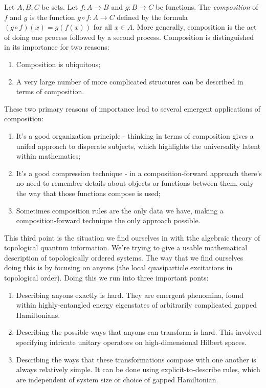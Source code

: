 \documentclass{article}
\theoremstyle{definition}
\numberwithin{figure}{section}
\begin{document}
Let $A,B,C$ be sets. Let $f:A\to B$ and $g:B\to C$ be functions. The \textit{composition} of $f$ and $g$ is the function $g\circ f: A\to C$ defined by the formula $(g\circ f)(x)=g(f(x))$ for all $x\in A$. More generally, composition is the act of doing one process followed by a second process. Composition is distinguished in its importance for two reasons:

\begin{enumerate}
\item Composition is ubiquitous;
\item A very large number of more complicated structures can be described in terms of composition.
\end{enumerate}

These two primary reasons of importance lead to several emergent applications of composition:

\begin{enumerate}
\item It's a good organization principle - thinking in terms of composition gives a unifed approach to disperate subjects, which highlights the universality latent within mathematics;
\item It's a good compression technique - in a composition-forward approach there's no need to remember details about objects or functions between them, only the way that those functions compose is used;
\item Sometimes composition rules are the only data we have, making a composition-forward technique the only approach possible.
\end{enumerate}

This third point is the situation we find ourselves in with tthe algebraic theory of topological quantum information. We're trying to give a usable mathematical description of topologically ordered systems. The way that we find ourselves doing this is by focusing on anyons (the local quasiparticle excitations in topological order). Doing this we run into three important ponts:

\begin{enumerate}
\item Describing anyons exactly is hard. They are emergent phenomina, found within highly-entangled energy eigenstates of arbitrarily complicated gapped Hamiltonians.
\item Describing the possible ways that anyons can transform is hard. This involved specifying intricate unitary operators on high-dimensional Hilbert spaces.
\item Describing the ways that these transformations compose with one another is always relatively simple. It can be done using explicit-to-describe rules, which are independent of system size or choice of gapped Hamiltonian.
\end{enumerate}
\end{document}

